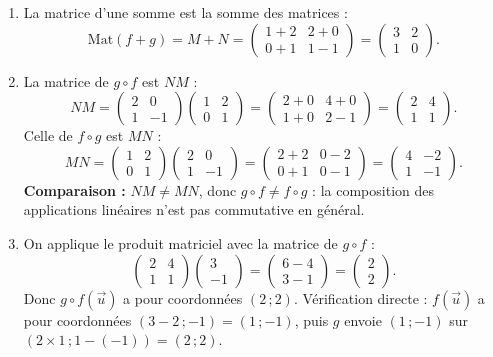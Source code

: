 \documentclass[11pt]{article}
\begin{document}
\begin{corrige}
\begin{enumerate}
\item La matrice d'une somme est la somme des matrices :
\[ \mathrm{Mat}(f+g)=M+N=\begin{pmatrix} 1+2 & 2+0 \\ 0+1 & 1-1 \end{pmatrix}=\begin{pmatrix} 3 & 2 \\ 1 & 0 \end{pmatrix}. \]

\item La matrice de $g\circ f$ est $NM$ :
\[ NM=\begin{pmatrix} 2 & 0 \\ 1 & -1 \end{pmatrix}\begin{pmatrix} 1 & 2 \\ 0 & 1 \end{pmatrix}=\begin{pmatrix} 2+0 & 4+0 \\ 1+0 & 2-1 \end{pmatrix}=\begin{pmatrix} 2 & 4 \\ 1 & 1 \end{pmatrix}. \]
Celle de $f\circ g$ est $MN$ :
\[ MN=\begin{pmatrix} 1 & 2 \\ 0 & 1 \end{pmatrix}\begin{pmatrix} 2 & 0 \\ 1 & -1 \end{pmatrix}=\begin{pmatrix} 2+2 & 0-2 \\ 0+1 & 0-1 \end{pmatrix}=\begin{pmatrix} 4 & -2 \\ 1 & -1 \end{pmatrix}. \]
\textbf{Comparaison :} $NM\neq MN$, donc $g\circ f\neq f\circ g$ : la composition des applications linéaires n'est pas commutative en général.

\item On applique le produit matriciel avec la matrice de $g\circ f$ :
\[ \begin{pmatrix} 2 & 4 \\ 1 & 1 \end{pmatrix}\begin{pmatrix} 3 \\ -1 \end{pmatrix}=\begin{pmatrix} 6-4 \\ 3-1 \end{pmatrix}=\begin{pmatrix} 2 \\ 2 \end{pmatrix}. \]
Donc $g\circ f(\vec{u})$ a pour coordonnées $(2\,;2)$. Vérification directe : $f(\vec{u})$ a pour coordonnées $(3-2\,;-1)=(1\,;-1)$, puis $g$ envoie $(1\,;-1)$ sur $(2\times1\,;1-(-1))=(2\,;2)$.


\end{enumerate}
\end{corrige}
\end{document}
